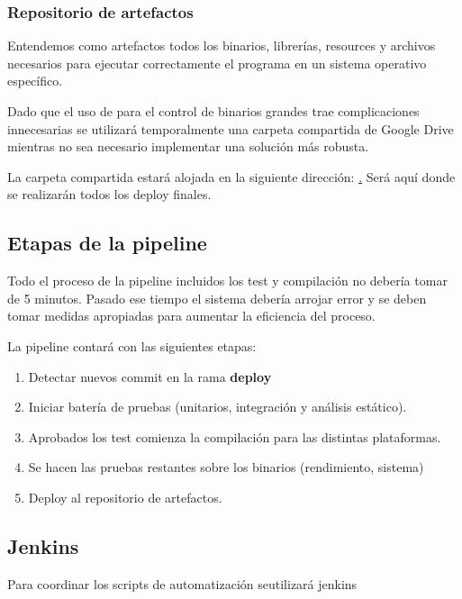 \subsubsection{Repositorio de artefactos}

Entendemos como artefactos todos los binarios, librerías, resources y archivos necesarios para ejecutar correctamente el programa en un sistema operativo específico.

Dado que el uso de  para el control de binarios grandes trae complicaciones innecesarias se utilizará temporalmente una carpeta compartida de Google Drive mientras no sea necesario implementar una solución más robusta.

La carpeta compartida estará alojada en la siguiente dirección: \href{https://drive.google.com/drive/folders/15OtN9fs-UASOKTRcWGbR-knWMSmQGyO_?usp=sharing}. Será aquí donde se realizarán todos los deploy finales.

\subsection{Etapas de la pipeline}

Todo el proceso de la pipeline incluidos los test y compilación no debería tomar de 5 minutos. Pasado ese tiempo el sistema debería arrojar error y se deben tomar medidas apropiadas para aumentar la eficiencia del proceso.

La pipeline contará con las siguientes etapas:

\begin{enumerate}
    \item Detectar nuevos commit en la rama \textbf{deploy}
    \item Iniciar batería de pruebas (unitarios, integración y análisis estático).
    \item Aprobados los test comienza la compilación para las distintas plataformas.
    \item Se hacen las pruebas restantes sobre los binarios (rendimiento, sistema)
    \item Deploy al repositorio de artefactos.
\end{enumerate}


\subsection{Jenkins}

Para coordinar los scripts de automatización seutilizará jenkins

